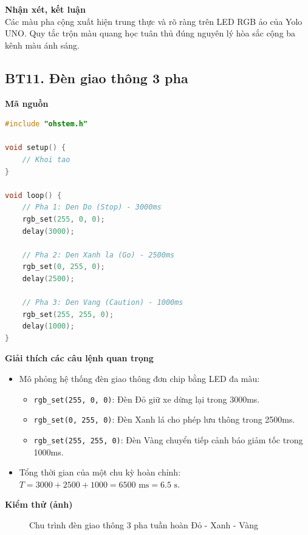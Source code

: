 \noindent\textbf{Nhận xét, kết luận}\\
Các màu pha cộng xuất hiện trung thực và rõ ràng trên LED RGB ảo của Yolo UNO. Quy tắc trộn màu quang học tuân thủ đúng nguyên lý hòa sắc cộng ba kênh màu ánh sáng.


\subsection*{BT11. Đèn giao thông 3 pha}

\noindent\textbf{Mã nguồn}\\
\begin{lstlisting}[language=C]
#include "ohstem.h"

void setup() {
    // Khoi tao
}

void loop() {
    // Pha 1: Den Do (Stop) - 3000ms
    rgb_set(255, 0, 0);
    delay(3000);

    // Pha 2: Den Xanh la (Go) - 2500ms
    rgb_set(0, 255, 0);
    delay(2500);

    // Pha 3: Den Vang (Caution) - 1000ms
    rgb_set(255, 255, 0);
    delay(1000);
}
\end{lstlisting}

\noindent\textbf{Giải thích các câu lệnh quan trọng}\\
\begin{itemize}
    \item Mô phỏng hệ thống đèn giao thông đơn chip bằng LED đa màu:
    \begin{itemize}
        \item \texttt{rgb\_set(255, 0, 0)}: Đèn Đỏ giữ xe dừng lại trong 3000ms.
        \item \texttt{rgb\_set(0, 255, 0)}: Đèn Xanh lá cho phép lưu thông trong 2500ms.
        \item \texttt{rgb\_set(255, 255, 0)}: Đèn Vàng chuyển tiếp cảnh báo giảm tốc trong 1000ms.
    \end{itemize}
    \item Tổng thời gian của một chu kỳ hoàn chỉnh: $T = 3000 + 2500 + 1000 = 6500\text{ ms} = 6.5\text{ s}$.
\end{itemize}

\noindent\textbf{Kiểm thử (ảnh)}\\
\begin{figure}[H]
    \centering
    \caption{Chu trình đèn giao thông 3 pha tuần hoàn Đỏ - Xanh - Vàng}
    \label{fig:bt11}
\end{figure}

